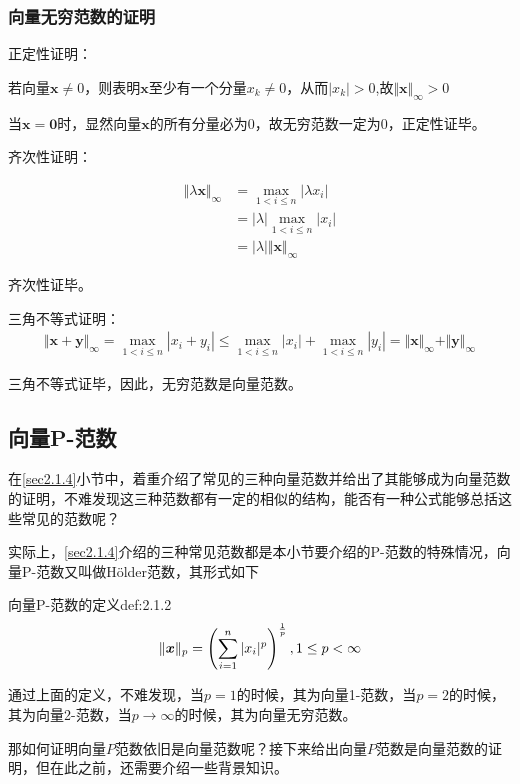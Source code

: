 \documentclass[12pt, a4paper, oneside, UTF8]{ctexbook}
\begin{document}
\subsubsection{向量无穷范数的证明}
\noindent
正定性证明：

若向量$\boldsymbol{x}\neq 0$，则表明$\boldsymbol{x}$至少有一个分量$x_k\neq 0$，从而$|x_k|>0$,故$\Vert \boldsymbol{x}\Vert_\infty>0$

当$\boldsymbol{x=0}$时，显然向量$\boldsymbol{x}$的所有分量必为0，故无穷范数一定为0，正定性证毕。

\noindent
齐次性证明：

\[
\begin{aligned}
    \Vert \lambda \boldsymbol{x}\Vert_\infty&=\max\limits_{1<i\leq n}|\lambda x_i|\\
    &=|\lambda|\max\limits_{1<i\leq n}|x_i|\\
    &=|\lambda|\Vert \boldsymbol{x}\Vert_\infty
\end{aligned}
\]

齐次性证毕。

\noindent
三角不等式证明：
\[
\begin{aligned}
    \Vert \boldsymbol{x+y}\Vert_\infty=\max\limits_{1<i\leq n}|x_i+y_i|\leq\max\limits_{1<i\leq n}|x_i|+\max\limits_{1<i\leq n}|y_i|=\Vert\boldsymbol{x}\Vert_\infty+\Vert\boldsymbol{y}\Vert_\infty
\end{aligned}
\]

三角不等式证毕，因此，无穷范数是向量范数。

\subsection{向量P-范数}{\label{sec2.1.5}}
在\ref{sec2.1.4}小节中，着重介绍了常见的三种向量范数并给出了其能够成为向量范数的证明，不难发现这三种范数都有一定的相似的结构，能否有一种公式能够总括这些常见的范数呢？

实际上，\ref{sec2.1.4}介绍的三种常见范数都是本小节要介绍的P-范数的特殊情况，向量P-范数又叫做Hölder范数，其形式如下
\begin{defn}{向量P-范数的定义}{def:2.1.2}
    \[\Vert\boldsymbol{x}\Vert_p=\left(\sum\limits_{i=1}^n|x_i|^p\right)^{\frac{1}{p}},1\leq p<\infty\]
\end{defn}

通过上面的定义，不难发现，当$p=1$的时候，其为向量1-范数，当$p=2$的时候，其为向量2-范数，当$p\to\infty$的时候，其为向量无穷范数。

那如何证明向量$P$范数依旧是向量范数呢？接下来给出向量$P$范数是向量范数的证明，但在此之前，还需要介绍一些背景知识。
\end{document}
